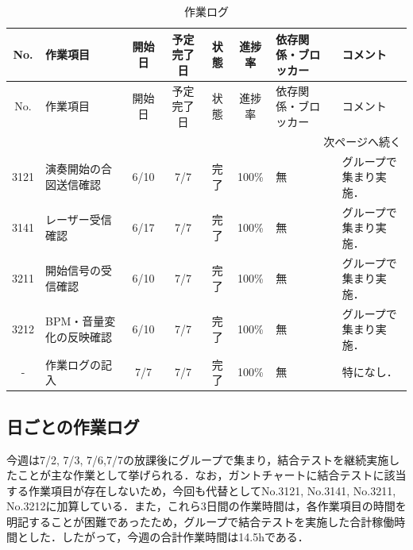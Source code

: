 \documentclass[uplatex,dvipdfmx,a4paper,11pt]{jsarticle}
\begin{document}
\begin{longtable}{|c|p{2.2cm}|c|c|c|c|p{2.4cm}|p{3.1cm}|}
\caption{作業ログ} \\
\hline
No. & 作業項目 & 開始日 & 予定完了日 & 状態 & 進捗率 & 依存関係・ブロッカー & コメント \\
\hline
\endfirsthead

\hline
No. & 作業項目 & 開始日 & 予定完了日 & 状態 & 進捗率 & 依存関係・ブロッカー & コメント \\
\hline
\endhead

\hline
\multicolumn{8}{r}{次ページへ続く} \\
\hline
\endfoot

\hline
\endlastfoot

3121 &
演奏開始の合図送信確認 &
6/10 &
7/7 &
完了 &
100\% &
無 &
グループで集まり実施．\\
\hline

3141 &
レーザー受信確認 &
6/17 &
7/7 &
完了 &
100\% &
無 &
グループで集まり実施．\\
\hline

3211 &
開始信号の受信確認 &
6/10 &
7/7 &
完了 &
100\% &
無 &
グループで集まり実施．\\
\hline

3212 &
BPM・音量変化の反映確認 &
6/10 &
7/7 &
完了 &
100\% &
無 &
グループで集まり実施．\\
\hline

- &
作業ログの記入 &
7/7 &
7/7 &
完了 &
100\% &
無 &
特になし．\\
\hline



\end{longtable}


\subsection{日ごとの作業ログ}
今週は7/2, 7/3, 7/6,7/7の放課後にグループで集まり，結合テストを継続実施したことが主な作業として挙げられる．なお，ガントチャートに結合テストに該当する作業項目が存在しないため，今回も代替としてNo.3121, No.3141, No.3211, No.3212に加算している．また，これら3日間の作業時間は，各作業項目の時間を明記することが困難であったため，グループで結合テストを実施した合計稼働時間とした．したがって，今週の合計作業時間は14.5hである．


    \renewcommand{\arraystretch}{1.2}

    \small
\end{document}
